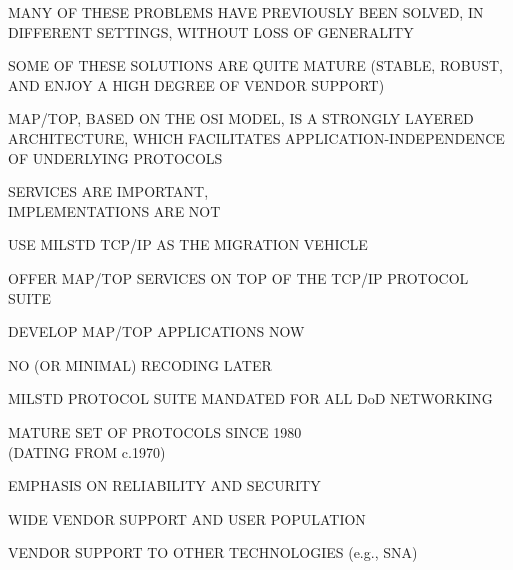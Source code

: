 \begin{bwslide}

\begin{nrtc}
\item	MANY OF THESE PROBLEMS HAVE PREVIOUSLY BEEN SOLVED, IN DIFFERENT
	SETTINGS, WITHOUT LOSS OF GENERALITY
    \begin{nrtc}
    \item	SOME OF THESE SOLUTIONS ARE QUITE MATURE (STABLE, ROBUST,
		AND ENJOY A HIGH DEGREE OF VENDOR SUPPORT)
    \end{nrtc}
\end{nrtc}
\end{bwslide}


\begin{bwslide}

\begin{nrtc}
\item	MAP/TOP, BASED ON THE OSI MODEL, IS A STRONGLY
	LAYERED ARCHITECTURE, WHICH FACILITATES
	APPLICATION-INDEPENDENCE OF UNDERLYING PROTOCOLS
    \begin{nrtc}
    \item	SERVICES ARE IMPORTANT,\\ IMPLEMENTATIONS ARE NOT
    \end{nrtc}
\end{nrtc}
\end{bwslide}


\begin{bwslide}

\begin{nrtc}
\item	USE MILSTD TCP/IP AS THE MIGRATION VEHICLE
    \begin{nrtc}
    \item	OFFER MAP/TOP SERVICES ON TOP OF THE
		TCP/IP PROTOCOL SUITE
    \item	DEVELOP MAP/TOP APPLICATIONS NOW
    \item	NO (OR MINIMAL) RECODING LATER
    \end{nrtc}
\end{nrtc}
\end{bwslide}

\begin{bwslide}

\begin{nrtc}
\item	MILSTD PROTOCOL SUITE MANDATED FOR ALL DoD NETWORKING
    \begin{nrtc}
    \item	MATURE SET OF PROTOCOLS SINCE 1980\\ (DATING FROM c.1970)
    \item	EMPHASIS ON RELIABILITY AND SECURITY
    \item	WIDE VENDOR SUPPORT AND USER POPULATION
    \item	VENDOR SUPPORT TO OTHER TECHNOLOGIES (e.g., SNA)
    \end{nrtc}
\end{nrtc}
\end{bwslide}


